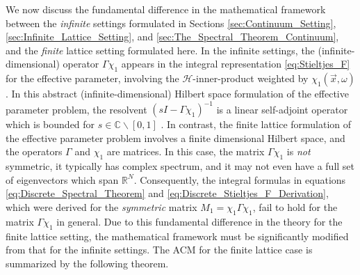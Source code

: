 \documentclass{cmslatex}
\begin{document}
We now discuss the fundamental difference in the mathematical
framework between the \emph{infinite}
settings formulated in Sections \ref{sec:Continuum_Setting},
\ref{sec:Infinite_Lattice_Setting}, and
\ref{sec:The_Spectral_Theorem_Continuum}, and the \emph{finite}
lattice setting formulated here. In the infinite settings, the
(infinite-dimensional) operator $\Gamma\chi_1$ appears in the integral
representation \eqref{eq:Stieltjes_F} for the effective parameter,
involving the $\mathscr{H}$-inner-product 
weighted by $\chi_1(\vec{x},\omega)$. In this abstract (infinite-dimensional)
Hilbert space formulation of the effective parameter problem, the
resolvent $(sI-\Gamma\chi_1)^{-1}$ is a linear self-adjoint operator which is
bounded for $s\in\mathbb{C}\backslash[0,1]$ \cite{Stone:64}. In contrast, the
finite lattice formulation of the effective parameter problem involves
a finite dimensional Hilbert space, and the operators $\Gamma$ and $\chi_1$
are matrices. In this case, the matrix $\Gamma\chi_1$ is \emph{not} symmetric,
it typically has complex spectrum, and it may not even have a full set
of eigenvectors which span $\mathbb{R}^N$. Consequently, the integral
formulas in equations \eqref{eq:Discrete_Spectral_Theorem} and
\eqref{eq:Discrete_Stieltjes_F_Derivation}, which were derived for the
\emph{symmetric} matrix $M_1=\chi_1\Gamma\chi_1$, fail to hold for the matrix
$\Gamma\chi_1$ in general. Due to this fundamental difference in the theory
for the finite lattice setting, the mathematical framework must be 
significantly modified from that for the infinite settings. The ACM
for the finite lattice case is summarized by the following theorem.
% 
\end{document}

